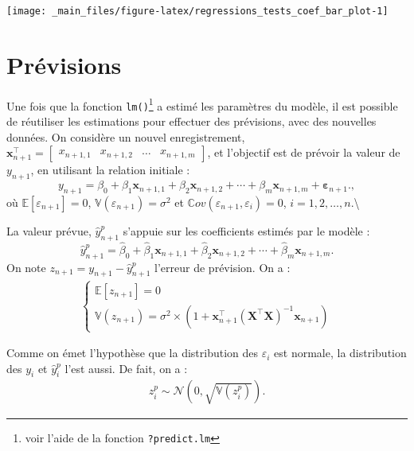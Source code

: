 \documentclass[
  11pt,
]{book}
\numberwithin{equation}{section}
\numberwithin{countremarque}{section}
\begin{document}
\begin{center}\texttt{[image: \_main\_files/figure-latex/regressions\_tests\_coef\_bar\_plot-1]} \end{center}

\hypertarget{regressions_previsions}{%
\section{Prévisions}\label{regressions_previsions}}

Une fois que la fonction \texttt{lm()}\footnote{voir l'aide de la fonction \texttt{?predict.lm}} a estimé les paramètres du modèle, il est possible de réutiliser les estimations pour effectuer des prévisions, avec des nouvelles données. On considère un nouvel enregistrement, \(\boldsymbol{x}^\top_{n+1} = \begin{bmatrix}  x_{n+1, 1} & x_{n+1, 2} & \ldots & x_{n+1, m}  \end{bmatrix}\), et l'objectif est de prévoir la valeur de \(y_{n+1}\), en utilisant la relation initiale :
\begin{equation}
y_{n+1} = \beta_0 + \beta_1 \boldsymbol x_{n+1,1} + \beta_2 \boldsymbol x_{n+1,2} + \cdots + \beta_m \boldsymbol x_{n+1,m} + \boldsymbol \varepsilon_{n+1}.\label{eq:regressions_previsions},
\end{equation}
où \(\mathbb{E}[\varepsilon_{n+1}] = 0\), \(\mathbb{V}(\varepsilon_{n+1}) = \sigma^2\) et \(\mathbb{C}ov(\varepsilon_{n+1}, \varepsilon_{i}) = 0\), \(i = 1, 2, \ldots, n\).\textbackslash{}

La valeur prévue, \(\hat y_{n+1}^p\) s'appuie sur les coefficients estimés par le modèle :
\begin{equation}
\hat y_{n+1}^p = \hat\beta_0 + \hat\beta_1 \boldsymbol x_{n+1,1} + \hat\beta_2 \boldsymbol x_{n+1,2} + \cdots + \hat\beta_m \boldsymbol x_{n+1,m}.\label{eq:regressions_previsions_2}
\end{equation}
On note \(z_{n+1} = y_{n+1} - \hat y_{n+1}^p\) l'erreur de prévision. On a :
\begin{align}
  \begin{cases}
  \mathbb{E}[z_{n+1}] = 0\\
  \mathbb{V}(z_{n+1}) = \sigma^2 \times \left( 1 + \boldsymbol {x}^\top_{n+1} (\boldsymbol X^\top \boldsymbol X)^{-1} \boldsymbol x_{n+1}  \right)
  \end{cases}
\end{align}

Comme on émet l'hypothèse que la distribution des \(\varepsilon_i\) est normale, la distribution des \(y_{i}\) et \(\hat y_{i}^p\) l'est aussi. De fait, on a :
\begin{align}
z_i^p \sim \mathcal{N}\left(0,\sqrt{\mathbb{V}(z_i^p)}\right).
\end{align}
\end{document}
